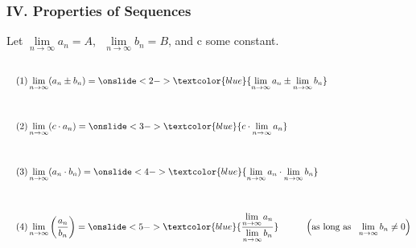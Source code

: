 \begin{frame}
\frametitle{IV. Properties of Sequences}
\scriptsize

Let $\lim \limits_{n \to \infty} a_n = A$, $\,\,\lim \limits_{n \to \infty} b_n = B$, and c some constant.

\begin{align*}
&\\
\quad &(1) \lim \limits_{n \to \infty} (a_n \pm b_n) = \onslide<2->{\textcolor{blue}{\lim \limits_{n \to \infty} a_n \pm \lim \limits_{n \to \infty} b_n}}  \\
&\\
&\\
\quad &(2) \lim \limits_{n \to \infty} (c \cdot a_n) = \onslide<3->{\textcolor{blue}{c \cdot \lim \limits_{n \to \infty} a_n}} \\
&\\
&\\
\quad &(3) \lim \limits_{n \to \infty} (a_n \cdot b_n) = \onslide<4->{\textcolor{blue}{\lim \limits_{n \to \infty} a_n \cdot \lim \limits_{n \to \infty} b_n}} \\
&\\
&\\
\quad &(4) \lim \limits_{n \to \infty} \left(\frac{a_n}{b_n}\right) = \onslide<5->{\textcolor{blue}{\frac{\lim \limits_{n \to \infty} a_n}{\lim \limits_{n \to \infty} b_n}}} \hspace{1.0cm} \left(\text{as long as } \,\, \lim \limits_{n \to \infty} b_n \ne 0\right)
\end{align*}

\vspace{0.5cm}


\end{frame}

